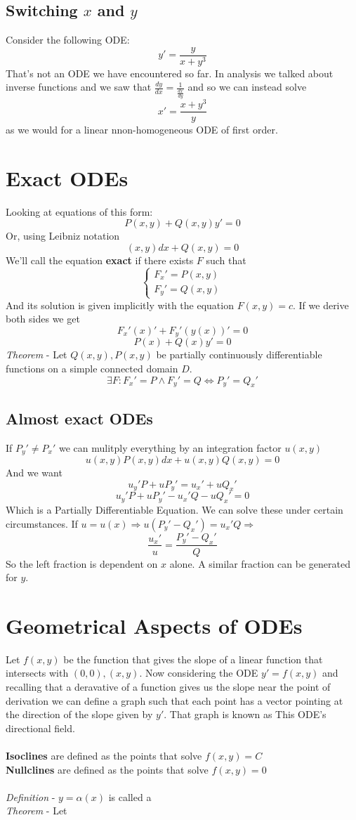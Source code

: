 \documentclass[11pt,a4paper]{article}
\begin{document}
	\subsection{Switching $x$ and $y$}
	Consider the following ODE:
	\[
	y'=\frac y{x+y^3}
	\]
	That's not an ODE we have encountered so far. In analysis we talked about inverse functions and we saw that $\frac{dy}{dx} = \frac{1}{\frac{dx}{dy}}$ and so we can instead solve
	\[
		x' = \frac{x+y^3}{y}
	\]
as we would for a linear nnon-homogeneous ODE of first order.
\newpage
\section{Exact ODEs}
Looking at equations of this form:
\[
	P(x,y)+Q(x,y)y'=0
\]
Or, using Leibniz notation
\[
	(x,y)dx+Q(x,y) = 0
\]
We'll call the equation \textbf{exact} if there exists $F$ such that
\begin{equation*}
    \begin{cases}
    F_x'=P(x,y) \\
    F_y'=Q(x,y)
    \end{cases}
\end{equation*}
And its solution is given implicitly with the equation $F(x,y)=c$. If we derive both sides we get
\[
	F_x'(x)'+F_y'(y(x))'=0
\]
\[
	P(x)+Q(x)y'=0
\]
\emph{Theorem} - Let $Q(x,y),P(x,y)$ be partially continuously differentiable functions on a simple connected domain $D$.
$$\exists F: F_x'=P\land F_y'=Q \iff P_y'=Q_x'$$
\subsection{Almost exact ODEs}
If $P_y'\ne P_x'$ we can mulitply everything by an integration factor $u(x,y)$
\[
	u(x,y)P(x,y)dx+u(x,y)Q(x,y) = 0
\]
And we want
\[
	u_y'P+uP_y' = u_x'+uQ_x'
\]
\[
	u_y'P+uP_y' - u_x'Q - uQ_x' = 0
\]
Which is a Partially Differentiable Equation. We can solve these under certain circumstances. If $u=u(x) \Rightarrow u(P_y' - Q_x') = u_x'Q \Rightarrow$
\[
	\frac{u_x'}{u}=\frac{P_y'-Q_x'}{Q}
\]
So the left fraction is dependent on $x$ alone. A similar fraction can be generated for $y$.
\newpage
\section{Geometrical Aspects of ODEs}
Let $f(x,y)$ be the function that gives the slope of a linear function that intersects with $(0,0),(x,y)$. Now considering the ODE $y'=f(x,y)$ and recalling that a deravative of a function gives us the slope near the point of derivation we can define a graph such that each point has a vector pointing at the direction of the slope given by $y'$. That graph is known as This ODE's directional field.
\\\\
\textbf{Isoclines} are defined as the points that solve $f(x,y)=C$\\
\textbf{Nullclines} are defined as the points that solve $f(x,y)=0$
\\\\
\emph{Definition} - $y=\alpha(x)$ is called a 
\\
\emph{Theorem} -  Let
\end{document}
